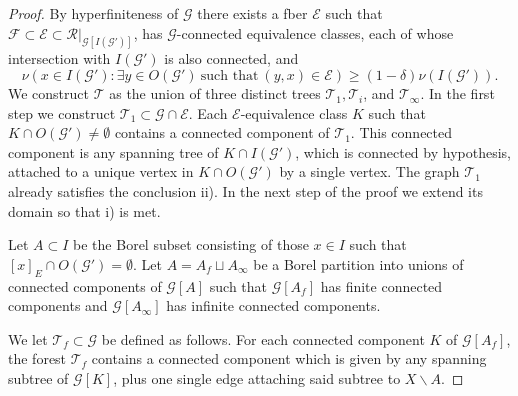 \documentclass[letterpaper,11pt,reqno]{amsart}
\theoremstyle{bfnote}
\theoremstyle{definition}
\newcommand{\0}{\varnothing}
\numberwithin{equation}{section}
\begin{document}
\begin{proof}
    By hyperfiniteness of $\mathcal{G}$ there exists a fber $\mathcal E$ such that $\mathcal{F} \subset \mathcal{E} \subset \mathcal{R}|_{\mathcal G[I(\mathcal G')]}$, has $\mathcal G$-connected equivalence classes, each of whose intersection with $I(\mathcal G')$ is also connected, and  \begin{equation*}
    \nu \left(x \in I(\mathcal G') : \exists y \in O(\mathcal{G}')\ \text{such that}\ (y,x) \in \mathcal{E}\right) \ge (1-\delta) \nu (I(\mathcal{G}')).
    \end{equation*}
    We construct $\mathcal{T}$ as the union of three distinct trees $\mathcal T_1, \mathcal T_i$, and $\mathcal T_\infty$. In the first step we construct $\mathcal{T}_1 \subset \mathcal{G} \cap \mathcal E$. Each $\mathcal E$-equivalence class $K$ such that $K \cap O(\mathcal G') \neq \emptyset$ contains a connected component of $\mathcal T_1$. This connected component is any spanning tree of $K \cap I(\mathcal G')$, which is connected by hypothesis, attached to a unique vertex in $K\cap O (\mathcal{G}')$ by a single vertex. The graph $\mathcal T_1$ already satisfies the conclusion ii). In the next step of the proof we extend its domain so that i) is met. 
    
    Let $A\subset I$ be the Borel subset consisting of those $x\in I$ such that $[x]_E \cap O (\mathcal{G}') = \emptyset$. Let $A = A_f \sqcup A_\infty$ be a Borel partition into unions of connected components of $\mathcal{G}[A]$ such that $\mathcal{G}[A_f]$ has finite connected components and $\mathcal{G}[A_\infty]$ has infinite connected components. 
    
    We let $\mathcal{T}_f \subset \mathcal G$ be defined as follows. For each connected component $K$ of $\mathcal G [A_f]$, the forest $\mathcal T_f$ contains a connected component which is given by any spanning subtree of $\mathcal G [K]$, plus one single edge attaching said subtree to $X \backslash A$. 
    

\end{proof}
\end{document}
